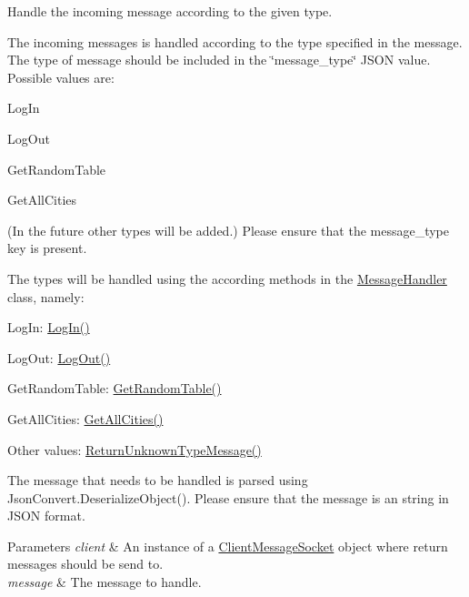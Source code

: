 Handle the incoming message according to the given type.

The incoming messages is handled according to the type specified in the message. The type of message should be included in the \char`\"{}message\+\_\+type\char`\"{} J\+S\+ON value. Possible values are\+:
\begin{DoxyItemize}
\item Log\+In
\item Log\+Out
\item Get\+Random\+Table
\item Get\+All\+Cities
\end{DoxyItemize}

(In the future other types will be added.) Please ensure that the message\+\_\+type key is present.

The types will be handled using the according methods in the \hyperlink{class_e_l_i_server_1_1_messaging_1_1_message_handler}{Message\+Handler} class, namely\+:
\begin{DoxyItemize}
\item Log\+In\+: \hyperlink{class_e_l_i_server_1_1_messaging_1_1_message_handler_ac7d3cf8905a2ddb6ff26f092c92fa886}{Log\+In()}
\item Log\+Out\+: \hyperlink{class_e_l_i_server_1_1_messaging_1_1_message_handler_a1fe43aa94ee3e3d03fcf147549eabced}{Log\+Out()}
\item Get\+Random\+Table\+: \hyperlink{class_e_l_i_server_1_1_messaging_1_1_message_handler_a45ed426f6fdc21493aa8727d44a1b502}{Get\+Random\+Table()}
\item Get\+All\+Cities\+: \hyperlink{class_e_l_i_server_1_1_messaging_1_1_message_handler_a3dd06c4f9c959db12a96af3397114861}{Get\+All\+Cities()}
\item Other values\+: \hyperlink{class_e_l_i_server_1_1_messaging_1_1_message_handler_a760bf18782afa59dd63cf733ad7adb3a}{Return\+Unknown\+Type\+Message()}
\end{DoxyItemize}

The message that needs to be handled is parsed using Json\+Convert.\+Deserialize\+Object(). Please ensure that the message is an string in J\+S\+ON format. 


\begin{DoxyParams}{Parameters}
{\em client} & An instance of a \hyperlink{class_e_l_i_server_1_1_messaging_1_1_client_message_socket}{Client\+Message\+Socket} object where return messages should be send to.\\
\hline
{\em message} & The message to handle.\\
\hline
\end{DoxyParams}
\mbox{\label{class_e_l_i_server_1_1_messaging_1_1_message_handler_ac7d3cf8905a2ddb6ff26f092c92fa886}} 
